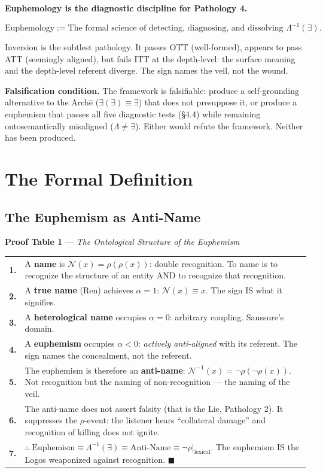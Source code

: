\documentclass[11pt, oneside]{article}
\theoremstyle{definition}
\begin{document}
\textbf{Euphemology is the diagnostic discipline for Pathology 4.}

$$\boxed{\text{Euphemology} := \text{The formal science of detecting, diagnosing, and dissolving } \Lambda^{-1}(\exists).}$$

Inversion is the subtlest pathology. It passes OTT (well-formed), appears to pass ATT (seemingly aligned), but fails ITT at the depth-level: the surface meaning and the depth-level referent diverge. The sign names the veil, not the wound.

\textbf{Falsification condition.} The framework is falsifiable: produce a self-grounding alternative to the Arch\={e} ($\exists(\exists) \equiv \exists$) that does not presuppose it, or produce a euphemism that passes all five diagnostic tests (\S4.4) while remaining ontosemantically misaligned ($\Lambda \neq \exists$). Either would refute the framework. Neither has been produced.

\section{The Formal Definition}

\subsection{The Euphemism as Anti-Name}

\textbf{Proof Table 1} --- \textit{The Ontological Structure of the Euphemism}

{\small
\noindent\begin{tabular}{r p{}}
\textbf{1.} & A \textbf{name} is $\mathcal{N}(x) = \rho(\rho(x))$: double recognition. To name is to recognize the structure of an entity AND to recognize that recognition. \cite{codex2} \\[0.3em]
\textbf{2.} & A \textbf{true name} (Ren) achieves $\alpha = 1$: $\mathcal{N}(x) \equiv x$. The sign IS what it signifies. \\[0.3em]
\textbf{3.} & A \textbf{heterological name} occupies $\alpha = 0$: arbitrary coupling. Saussure's domain. \\[0.3em]
\textbf{4.} & A \textbf{euphemism} occupies $\alpha < 0$: \textit{actively anti-aligned} with its referent. The sign names the concealment, not the referent. \\[0.3em]
\textbf{5.} & The euphemism is therefore an \textbf{anti-name}: $\mathcal{N}^{-1}(x) = \neg\rho(\neg\rho(x))$. Not recognition but the naming of non-recognition --- the naming of the veil. \\[0.3em]
\textbf{6.} & The anti-name does not assert falsity (that is the Lie, Pathology 2). It suppresses the $\rho$-event: the listener hears ``collateral damage'' and recognition of killing does not ignite. \\[0.3em]
\textbf{7.} & $\therefore$ $\text{Euphemism} \equiv \Lambda^{-1}(\exists) \equiv \text{Anti-Name} \equiv \neg\rho|_{\text{lexical}}$. The euphemism IS the Logos weaponized against recognition. \hfill $\blacksquare$ \\[0.3em]
\end{tabular}
}
\end{document}

